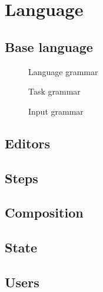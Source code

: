 


\section{Language}



\subsection{Base language}


\begin{figure}
  \caption{Language grammar} \label{fig:language-grammar}
\end{figure}

\begin{figure}
  \caption{Task grammar} \label{fig:task-grammar}
\end{figure}

\begin{figure}
  \caption{Input grammar} \label{fig:input-grammar}
\end{figure}



\subsection{Editors}



\subsection{Steps}



\subsection{Composition}



\subsection{State}



\subsection{Users}


